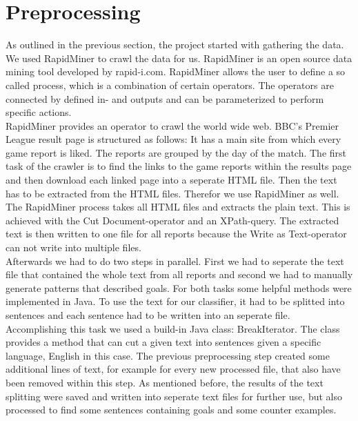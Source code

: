 \documentclass[11pt,titlepage,oneside,openany]{book}
\begin{document}
\section{Preprocessing}
\label{sec:preproc}
As outlined in the previous section, the project started with gathering the data. We used RapidMiner to crawl the data for us. RapidMiner is an open source data mining tool developed by rapid-i.com. RapidMiner allows the user to define a so called process, which is a combination of certain operators. The operators are connected by defined in- and outputs and can be parameterized to perform specific actions. \\
RapidMiner provides an operator to crawl the world wide web. BBC's Premier League result page is structured as follows: It has a main site from which every game report is liked. The reports are grouped by the day of the match. The first task of the crawler is to find the links to the game reports within the results page and then download each linked page into a seperate HTML file. Then the text has to be extracted from the HTML files. Therefor we use RapidMiner as well. The RapidMiner process takes all HTML files and extracts the plain text. This is achieved with the Cut Document-operator and an XPath-query. The extracted text is then written to one file for all reports because the Write as Text-operator can not write into multiple files. \\ 

Afterwards we had to do two steps in parallel. First we had to seperate the text file that contained the whole text from all reports and second we had to manually generate patterns that described goals.
For both tasks some helpful methods were implemented in Java. To use the text for our classifier, it had to be splitted into sentences and each sentence had to be written into an seperate file. Accomplishing this task we used a build-in Java class: BreakIterator. The class provides a method that can cut a given text into sentences given a specific language, English in this case. The previous preprocessing step created some additional lines of text, for example for every new processed file, that also have been removed within this step. As mentioned before, the results of the text splitting were saved and written into seperate text files for further use, but also processed to find some sentences containing goals and some counter examples. \\
\end{document}
